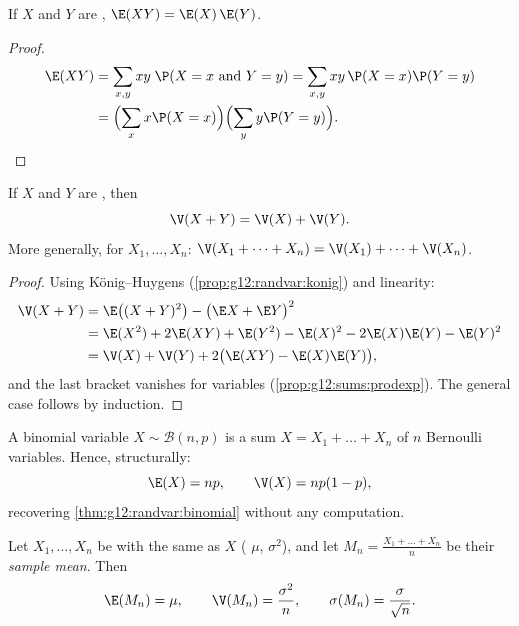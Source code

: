 \begin{proposition}\label{prop:g12:sums:prodexp}
If $X$ and $Y$ are , $\E(XY) = \E(X)\,\E(Y)$.
\end{proposition}

\begin{proof}
\[
\begin{aligned}
\E(XY) &= \sum_{x, y} xy\;\P(X = x \text{ and } Y = y)
= \sum_{x, y} xy\,\P(X=x)\P(Y=y) \\
&= \Bigl(\sum_x x\P(X=x)\Bigr)\Bigl(\sum_y y\P(Y=y)\Bigr). \qedhere
\end{aligned}
\]
\end{proof}

\begin{theorem}\label{thm:g12:sums:variance}
If $X$ and $Y$ are \emph{}, then
\[
\V(X + Y) = \V(X) + \V(Y).
\]
More generally, for  $X_1, \dots, X_n$:
$\V(X_1 + \dots + X_n) = \V(X_1) + \dots + \V(X_n)$.
\end{theorem}

\begin{proof}
Using König--Huygens (\cref{prop:g12:randvar:konig}) and linearity:
\begin{align*}
\V(X + Y) &= \E\bigl((X+Y)^2\bigr) - \bigl(\E X + \E Y\bigr)^2\\
&= \E(X^2) + 2\E(XY) + \E(Y^2)
- \E(X)^2 - 2\E(X)\E(Y) - \E(Y)^2\\
&= \V(X) + \V(Y) + 2\bigl(\E(XY) - \E(X)\E(Y)\bigr),
\end{align*}
and the last bracket vanishes for  variables
(\cref{prop:g12:sums:prodexp}). The general case follows by induction.
\end{proof}

\begin{example}\label{ex:g12:sums:binomial}
A binomial variable $X \sim \mathcal B(n, p)$ is a sum
$X = X_1 + \dots + X_n$ of $n$  Bernoulli variables. Hence,
structurally:
\[
\E(X) = np, \qquad \V(X) = np(1-p),
\]
recovering \cref{thm:g12:randvar:binomial} without any computation.
\end{example}

\begin{proposition}\label{prop:g12:sums:mean}
Let $X_1, \dots, X_n$ be  with the same  as $X$
( $\mu$,  $\sigma^2$), and let
$M_n = \frac{X_1 + \dots + X_n}{n}$ be their \emph{sample
mean}. Then
\[
\E(M_n) = \mu, \qquad \V(M_n) = \frac{\sigma^2}{n}, \qquad
\sigma(M_n) = \frac{\sigma}{\sqrt n}.
\]
\end{proposition}


